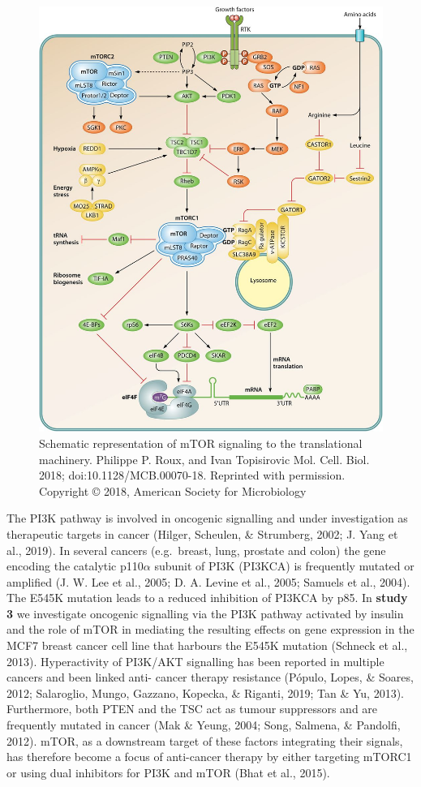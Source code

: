 \documentclass[12pt,openany]{book}
\begin{document}
\begin{figure}
  \includegraphics{./figures/mTORsignal.jpg}
  \caption{Schematic representation of mTOR signaling to the translational machinery. Philippe P. Roux, and Ivan Topisirovic Mol. Cell. Biol. 2018; doi:10.1128/MCB.00070-18. Reprinted with permission. Copyright © 2018, American Society for Microbiology
 \label{fig:mtorsignal}}
\end{figure}

The PI3K pathway is involved in oncogenic signalling and under
investigation as therapeutic targets in cancer (Hilger, Scheulen, \&
Strumberg, 2002; J. Yang et al., 2019). In several cancers (e.g.~breast,
lung, prostate and colon) the gene encoding the catalytic p110\(\alpha\)
subunit of PI3K (PI3KCA) is frequently mutated or amplified (J. W. Lee
et al., 2005; D. A. Levine et al., 2005; Samuels et al., 2004). The
E545K mutation leads to a reduced inhibition of PI3KCA by p85. In
\textbf{study 3} we investigate oncogenic signalling via the PI3K
pathway activated by insulin and the role of mTOR in mediating the
resulting effects on gene expression in the MCF7 breast cancer cell line
that harbours the E545K mutation (Schneck et al., 2013). Hyperactivity
of PI3K/AKT signalling has been reported in multiple cancers and been
linked anti- cancer therapy resistance (Pópulo, Lopes, \& Soares, 2012;
Salaroglio, Mungo, Gazzano, Kopecka, \& Riganti, 2019; Tan \& Yu, 2013).
Furthermore, both PTEN and the TSC act as tumour suppressors and are
frequently mutated in cancer (Mak \& Yeung, 2004; Song, Salmena, \&
Pandolfi, 2012). mTOR, as a downstream target of these factors
integrating their signals, has therefore become a focus of anti-cancer
therapy by either targeting mTORC1 or using dual inhibitors for PI3K and
mTOR (Bhat et al., 2015).
\end{document}
